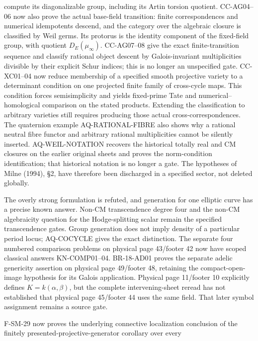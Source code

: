 \begin{description}[style=nextline,leftmargin=0pt]
compute its diagonalizable group, including its Artin torsion quotient. CC-AG04--06 now also prove the
actual base-field transition: finite correspondences and numerical
idempotents descend, and the category over the algebraic closure is
classified by Weil germs. Its protorus is the identity component of
the fixed-field group, with quotient $D_E(\mu_\infty)$.
CC-AG07--08 give the exact finite-transition sequence and classify
rational object descent by Galois-invariant multiplicities divisible
by their explicit Schur indices; this is no longer an unspecified gate.
CC-XC01--04 now reduce membership of a specified smooth projective
variety to a determinant condition on one projected finite family
of cross-cycle maps. This condition forces semisimplicity and yields
fixed-prime Tate and numerical--homological comparison on the stated
products. Extending the classification to arbitrary varieties still
requires producing those actual cross-correspondences. The
quaternion example AQ-RATIONAL-FIBRE also shows why a rational neutral
fibre functor and arbitrary rational multiplicities cannot be silently
inserted. AQ-WEIL-NOTATION recovers the historical totally real and CM
closures on the earlier original sheets and proves the norm-condition
identification; that historical notation is no longer a gate.
The hypotheses of Milne (1994), \S2, have therefore been
discharged in a specified sector, not deleted globally.
\item[Cote 18, scans 11--13 and 59: period density.]
The overly strong formulation is refuted, and generation for one
elliptic curve has a precise known answer. Non-CM transcendence degree
four and the non-CM algebraicity question for the Hodge-splitting
scalar remain the specified transcendence gates. Group generation
does not imply density of a particular period locus; AQ-COCYCLE
gives the exact distinction. The separate four numbered comparison
problems on physical page 43/footer 42 now have scoped classical
answers KN-COMP01--04. BR-18-AD01 proves the separate adelic
genericity assertion on physical page 49/footer 48, retaining the
compact-open-image hypothesis for its Galois application.
Physical page 11/footer 10 explicitly defines $K=k(\alpha,\beta)$,
but the complete intervening-sheet reread has not established that
physical page 45/footer 44 uses the same field. That later symbol
assignment remains a source gate.
\item[Cote 134-8, footers 47--54: abstract scope and ordinary right adjoint.]
F-SM-29 now proves the underlying connective localization conclusion
of the finitely presented-projective-generator corollary over every

\end{description}
